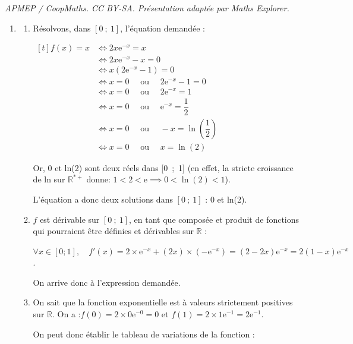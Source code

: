 \documentclass[10pt]{article}
\providecommand{\R}{\mathbb{R}}
\providecommand{\e}{{\mathrm{e}}}
\begin{document}
\noindent\textit{APMEP / CoopMaths. CC BY-SA. Présentation adaptée par Maths Explorer.}\par\medskip
\medskip

	\begin{enumerate}
		\item \begin{enumerate}
	\item Résolvons, dans $[0~;~1]$, l'équation demandée :

$ \begin{aligned}[t]  f(x) = x &\iff 2x \e^{-x} = x\\
&\iff 2x \e^{-x} - x = 0\\
&\iff x(2\e^{-x}-1) = 0\\
&\iff x = 0 \quad \text{ ou } \quad 2\e^{-x} - 1 = 0\\
&\iff x = 0 \quad \text{ ou } \quad 2\e^{-x} = 1\\
&\iff x = 0 \quad \text{ ou } \quad \e^{-x} = \dfrac{1}{2}\\
&\iff x = 0 \quad \text{ ou } \quad -x = \ln\left(\dfrac{1}{2}\right) \\
&\iff x = 0 \quad \text{ ou } \quad x = \ln(2)
\end{aligned}$

Or, 0 et ln(2) sont deux réels dans [0~;~1] (en effet, la stricte croissance de ln sur $\R^{*+}$ donne: \quad $1 < 2 < \e \implies 0 < \ln(2) < 1$).

L'équation a donc deux solutions dans $ [0~;~1] $ : 0 et ln(2).

	\item $f$ est dérivable sur $ [0~;~1] $, en tant que composée et produit de fonctions qui pourraient être définies et dérivables sur $\R$ :

$\forall x \in [0 ; 1],\quad f'(x) = 2 \times \e^{-x} + (2x) \times (-\e^{-x})
 = (2 - 2x)\e^{-x} = 2(1 -x)\e^{-x}$.

On arrive donc à l'expression demandée.

		\item On sait que la fonction exponentielle est à valeurs strictement positives sur $\R$. On a :\quad $f(0) = 2\times 0 \e^{-0} = 0$ \quad et \quad $f(1) = 2\times 1\e^{-1} = 2\e^{-1}$.

On peut donc établir le tableau de variations de la fonction :

\begin{center}
			\end{center}
		\end{enumerate}


\end{enumerate}
\end{document}
